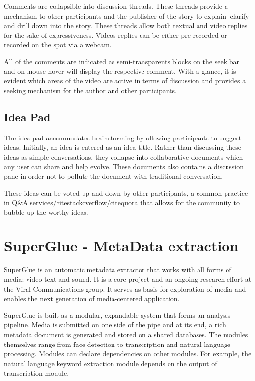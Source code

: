 Comments are collapsible into discussion threads. These threads provide a mechanism to other participants and the publisher of the story to explain, clarify and drill down into the story. These threads allow both textual and video replies for the sake of expressiveness. Videos replies can be either pre-recorded or recorded on the spot via a webcam. 


All of the comments are indicated as semi-transparents blocks on the seek bar and on mouse hover will display the respective comment. With a glance, it is evident which areas of the video are active in terms of discussion and provides a seeking mechanism for the author and other participants.  
\subsection{Idea Pad}


The idea pad accommodates brainstorming by allowing participants to suggest ideas. Initially, an idea is entered as an idea title. Rather than discussing these ideas as simple conversations, they collapse into collaborative documents which any user can share and help evolve. These documents also contains a discussion pane in order not to pollute the document with traditional conversation. 

These ideas can be voted up and down by other participants, a common practice in Q\&A services/cite{stackoverflow}/cite{quora} that allows for the community to bubble up the worthy ideas.   

\section{SuperGlue - MetaData extraction}
SuperGlue is an automatic metadata extractor that works with all forms of media: video text and sound. It is a core project and an ongoing research effort at the Viral Communications group. It serves as basis for exploration of media and enables the next generation of media-centered application.

SuperGlue is built as a modular, expandable system that forms an analysis pipeline. Media is submitted on one side of the pipe and at its end, a rich metadata document is generated and stored on a shared databases. The modules themselves range from face detection to transcription and natural language processing. Modules can declare dependencies on other modules. For example, the natural language keyword extraction module depends on the output of transcription module.

